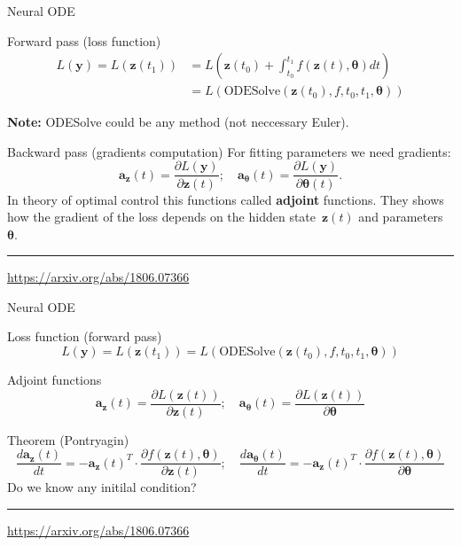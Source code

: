 \documentclass{beamer}
\newcommand{\ba}{\mathbf{a}}
\newcommand{\bz}{\mathbf{z}}
\newcommand{\by}{\mathbf{y}}
\newcommand{\btheta}{\boldsymbol{\theta}}
\begin{document}
\begin{frame}{Neural ODE}
	\begin{block}{Forward pass (loss function)}
		\vspace{-0.5cm}
		\begin{align*}
			L(\by) = L(\bz(t_1)) &= L\left( \bz(t_0) + \int_{t_0}^{t_1} f(\bz(t), \btheta) dt \right) \\ &= L\left(\text{ODESolve}(\bz(t_0), f, t_0,t_1, \btheta) \right)
		\end{align*}
	\vspace{-0.5cm}
	\end{block}
	\textbf{Note:} ODESolve could be any method (not neccessary Euler).
	\begin{block}{Backward pass (gradients computation)}
		For fitting parameters we need gradients:
		\[
		\ba_{\bz}(t) = \frac{\partial L(\by)}{\partial \bz(t)}; \quad \ba_{\btheta}(t) = \frac{\partial L(\by)}{\partial \btheta(t)}.
		\]
		In theory of optimal control this functions called \textbf{adjoint} functions. 
		They shows how the gradient of the loss depends on the hidden state~$\bz(t)$ and parameters $\btheta$.
	\end{block}
	\vspace{0.1cm}
		
	\hrule\medskip
	{\scriptsize \href{https://arxiv.org/abs/1806.07366}{https://arxiv.org/abs/1806.07366}}   
\end{frame}
\begin{frame}{Neural ODE}
	\begin{block}{Loss function (forward pass)}
	\vspace{-0.2cm}
	\[
	    L(\by) = L(\bz(t_1)) = L\left(\text{ODESolve}(\bz(t_0), f, t_0,t_1, \btheta) \right)
	\]
	\vspace{-0.3cm}
	\end{block}
	\begin{block}{Adjoint functions}
	\vspace{-0.2cm}
	\[
	    \ba_{\bz}(t) = \frac{\partial L(\bz(t))}{\partial \bz(t)}; \quad \ba_{\btheta}(t) = \frac{\partial L(\bz(t))}{\partial \btheta}
	\]
	\vspace{-0.2cm}
	\end{block}
	\begin{block}{Theorem (Pontryagin)}
	\vspace{-0.3cm}
	\[
	    \frac{d \ba_{\bz}(t)}{dt} = - \ba_{\bz}(t)^T \cdot \frac{\partial f(\bz(t), \btheta)}{\partial \bz(t)}; \quad  \frac{d \ba_{\btheta}(t)}{dt} = - \ba_{\bz}(t)^T \cdot \frac{\partial f(\bz(t), \btheta)}{\partial \btheta}
	\]
	Do we know any initilal condition?
	\end{block}
	 \vfill
	\hrule\medskip
	{\scriptsize \href{https://arxiv.org/abs/1806.07366}{https://arxiv.org/abs/1806.07366}}   
\end{frame}
\end{document}
